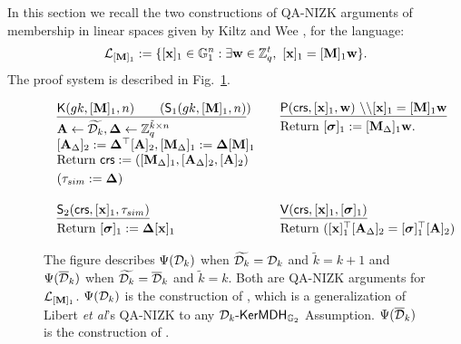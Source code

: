 In this section we recall the two constructions of QA-NIZK arguments of membership in linear spaces given by 
Kiltz and Wee \cite{EC:KilWee15}, for the language:
 $$\mathcal{L}_{[\mathbf{{M}}]_1}:=\{ [\mathbf{x}]_1 \in \mathbb{G}_1^{n}:  \exists \mathbf{w} \in \mathbb{Z}_q^{t}, \  [\mathbf{x}]_1=[\mathbf{{M}}]_1\mathbf{w} \}.$$ 
The proof system is described in Fig.~\ref{fig:QANIZKlinear}. 

\begin{figure} 
$$
\begin{array}{ll}
\begin{array}{l}
\underline{\algK(gk,[\matr{M}]_1,n) \qquad  (\mathsf{S}_1(gk,[\matr{M}]_1,n)})\\[.1cm]

\matr{A} \gets \widetilde{\dist_{k}}, \matr{\Delta} \gets \Z_q^{\tilde{k} \times n}\\
{[\matr{A}_{\Delta}]_2:= \matr{\Delta}^\top[\matr{A}]_2, [\matr{M}_{\Delta}]_1:=\matr{\Delta} [\matr{M}]_1} \\
\text{Return} \ \mathsf{crs}:=([\matr{M}_{\Delta}]_1, [\matr{A}_\Delta]_2, [\matr{A}]_2)\\ [.1cm]
(\tau_{sim}:=\matr{\Delta})
\end{array}
&
\begin{array}{l}
\underline{\algP(\mathsf{crs},[\vecb{x}]_1, \vecb{w}) \  \backslash \backslash [\vecb{x}]_1=[\matr{M}]_1 \vecb{w}} \\[.1cm]

 \text{Return } [\grkb{\sigma}]_1:=[\matr{M}_{\Delta}]_1 \vecb{w}.
\\
\\
\\
\vspace*{.2cm}
\end{array}
\\
\\
\begin{array}{l}
\underline{\mathsf{S}_2(\crs,[\vecb{x}]_1,\tau_{sim})}   \\ [.1cm]
  \text{Return} \ [\grkb{\sigma}]_1:= \matr{\Delta} [\vecb{x}]_1
\end{array}
&
\begin{array}{l}
\underline{\algV(\mathsf{crs},[\vecb{x}]_1,[\grkb{\sigma}]_1)}\\ [.1cm]
\text{Return} \ ([\vecb{x}]_1^\top [\matr{A}_\Delta]_2 = [\grkb{\sigma}]_1^\top[\matr{A}]_2)
\end{array}
\end{array}
$$
\caption{The figure describes $\ps$ when $\widetilde{\dist_{k}}=\dist_k$ and  $\tilde{k}=k+1$ and $\psws$ when $\widetilde{\dist_{k}}=\overline{\dist}_k$ and  $\tilde{k}=k$. Both are QA-NIZK arguments for $\mathcal{L}_{[\matr{M}]_1}$. 
$\ps$  is the construction of \cite[Section~3.1]{EC:KilWee15},
  which is a generalization 
of Libert \textit{et al}'s QA-NIZK \cite{EC:LPJY14} to any $\dist_k\mbox{-}\fmdh_{\Hr}$ Assumption. $\psws$ is the construction of  \cite[Section~3.2.]{EC:KilWee15}%
  .}
\label{fig:QANIZKlinear}
\end{figure}

